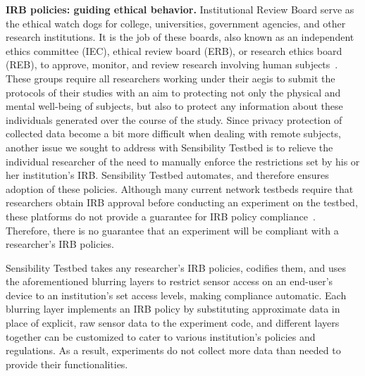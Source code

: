 \textbf{IRB policies: guiding ethical behavior.}
Institutional Review Board serve as the ethical watch dogs for college, 
universities, government agencies, and other research institutions. 
It is the job of these boards, also known as an independent ethics committee 
(IEC), ethical review board (ERB), or research ethics board (REB), 
to approve, monitor, and review research involving human 
subjects~\cite{irb}. These groups require all researchers working under 
their aegis to submit the protocols of their studies with an aim to 
protecting not only the physical and mental well-being of subjects, 
but also to protect any information about these individuals generated 
over the course of the study. Since privacy protection of collected data 
become a bit more difficult when dealing with remote subjects, another 
issue we sought to address with Sensibility Testbed is to relieve the 
individual researcher of the need to manually enforce the restrictions 
set by his or her institution's IRB. Sensibility Testbed automates, and 
therefore ensures adoption of these policies. Although many current network 
testbeds require that researchers obtain IRB approval before conducting
an experiment on the testbed, these platforms do not provide a guarantee 
for IRB policy compliance~\cite{nandugudi2013phonelab, nikravesh2015mobilyzer}.
Therefore, there is no guarantee that an 
experiment will be compliant with a researcher's IRB policies.

Sensibility Testbed takes any researcher's IRB policies, codifies them, and 
uses the aforementioned blurring layers to restrict sensor access on an 
end-user's device to an institution's set access levels, making compliance 
automatic. 
Each blurring layer implements an IRB policy by substituting approximate 
data in place of explicit, raw sensor data to the experiment code, and different 
layers together can be customized to cater to various institution's 
policies and regulations. As a result, experiments do not collect more 
data than needed to provide their functionalities.


